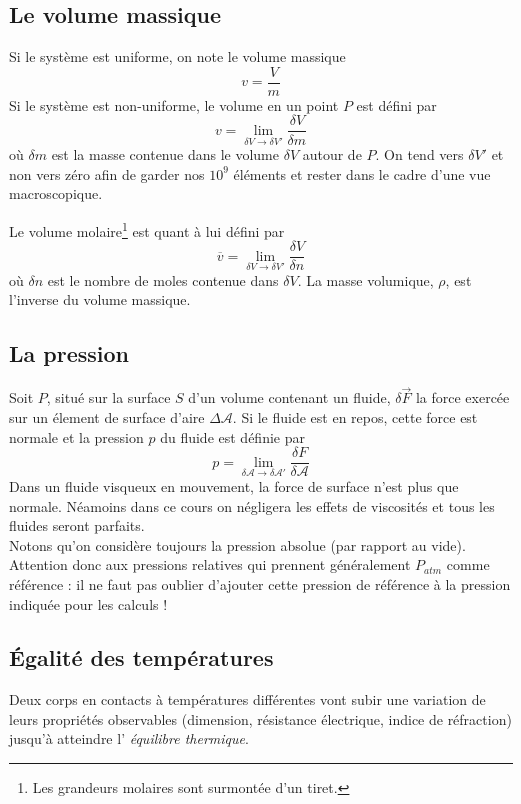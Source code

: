 	
\subsection{Le volume massique}
Si le système est uniforme, on note le volume massique 
\begin{equation}
	v = \frac{V}{m}
\end{equation}
Si le système est non-uniforme, le volume en un point $P$ est défini 
par
\begin{equation}
	v = \lim\limits_{\delta V \rightarrow \delta V'} \frac{\delta V}{
		\delta m}
\end{equation}
où $\delta m$ est la masse contenue dans le volume $\delta V$ autour 
de $P$. On tend vers $\delta V'$ et non vers zéro afin de garder nos 
$10^9$ éléments et rester dans le cadre d'une vue macroscopique.
	
Le volume molaire\footnote{Les grandeurs molaires sont surmontée d'un 
tiret.} est quant à lui défini par
\begin{equation}
	\overline{v} = \lim\limits_{\delta V \rightarrow \delta V'} \frac{
		\delta V}{\delta n}
\end{equation}
où $\delta n$ est le nombre de moles contenue dans $\delta V$. La 
masse volumique, $\rho$, est l'inverse du volume massique.
	
	
\subsection{La pression}
Soit $P$, situé sur la surface $S$ d'un volume contenant un fluide, 
$\delta \vec F$ la force exercée sur un élement de surface d'aire 
$\Delta \mathcal{A}$. Si le fluide est en repos, cette force est 
normale et la pression $p$ du fluide est définie par
\begin{equation}
	p = \lim\limits_{\delta\mathcal{A}\rightarrow\delta\mathcal{A}'} 
	\frac{\delta F}{\delta \mathcal{A}}
\end{equation}		
Dans un fluide visqueux en mouvement, la force de surface n'est 
plus que normale. Néamoins dans ce cours on négligera les effets 
de viscosités et tous les fluides seront parfaits.\\
Notons qu'on considère toujours la pression absolue (par rapport 
au vide). Attention donc aux pressions relatives qui prennent 
généralement $P_{atm}$ comme référence : il ne faut pas oublier 
d'ajouter cette pression de référence à la pression indiquée 
pour les calculs !
	
	
\subsection{Égalité des températures}
Deux corps en contacts à températures différentes vont subir une 
variation de leurs propriétés observables (dimension, résistance 
électrique, indice de réfraction) jusqu'à atteindre l'\textit{
équilibre thermique}.
	
